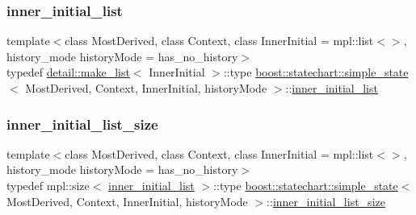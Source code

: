 \subsubsection{\texorpdfstring{inner\+\_\+initial\+\_\+list}{inner\_initial\_list}}
{\footnotesize\ttfamily template$<$class Most\+Derived, class Context, class Inner\+Initial = mpl\+::list$<$$>$, history\+\_\+mode history\+Mode = has\+\_\+no\+\_\+history$>$ \\
typedef \mbox{\hyperlink{structboost_1_1statechart_1_1detail_1_1make__list}{detail\+::make\+\_\+list}}$<$ Inner\+Initial $>$\+::type \mbox{\hyperlink{classboost_1_1statechart_1_1simple__state}{boost\+::statechart\+::simple\+\_\+state}}$<$ Most\+Derived, Context, Inner\+Initial, history\+Mode $>$\+::\mbox{\hyperlink{classboost_1_1statechart_1_1simple__state_ae86cab19f07d10cd8e46937fd243d4ba}{inner\+\_\+initial\+\_\+list}}}

\mbox{\label{classboost_1_1statechart_1_1simple__state_ad853d83a11c3ad24de964badf9ba95cb}} 
\subsubsection{\texorpdfstring{inner\+\_\+initial\+\_\+list\+\_\+size}{inner\_initial\_list\_size}}
{\footnotesize\ttfamily template$<$class Most\+Derived, class Context, class Inner\+Initial = mpl\+::list$<$$>$, history\+\_\+mode history\+Mode = has\+\_\+no\+\_\+history$>$ \\
typedef mpl\+::size$<$ \mbox{\hyperlink{classboost_1_1statechart_1_1simple__state_ae86cab19f07d10cd8e46937fd243d4ba}{inner\+\_\+initial\+\_\+list}} $>$\+::type \mbox{\hyperlink{classboost_1_1statechart_1_1simple__state}{boost\+::statechart\+::simple\+\_\+state}}$<$ Most\+Derived, Context, Inner\+Initial, history\+Mode $>$\+::\mbox{\hyperlink{classboost_1_1statechart_1_1simple__state_ad853d83a11c3ad24de964badf9ba95cb}{inner\+\_\+initial\+\_\+list\+\_\+size}}}

\mbox{\label{classboost_1_1statechart_1_1simple__state_a8b829f6ba90355ad7ea32d9dcc7e09ad}} 
